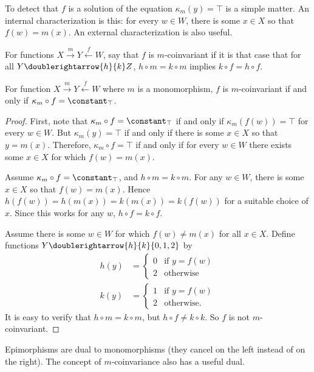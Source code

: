 To detect that $f$ is a solution of the equation $\kappa_m(y)=\top$ is a simple matter. An internal characterization is this: for every $w\in W$, there is some $x\in X$ so that $f(w)=m(x)$. An external characterization is also useful.

\begin{defn}
	For functions $X\stackrel{m}{\longrightarrow}Y\stackrel{f}{\longleftarrow}W$, say that $f$ is {$m$-coinvariant} if it is that case that for all $Y\doublerightarrow{h}{k}Z$, $h\circ m=k\circ m$ implies $k\circ f = h\circ f$.
\end{defn}

\begin{lemma}
	For function $X\stackrel{m}{\longrightarrow}Y\stackrel{f}{\longleftarrow}W$ where $m$ is a monomorphism, $f$ is $m$-coinvariant if and only if $\kappa_m\circ f = \constant_\top$.

\begin{proof}
	First, note that $\kappa_m\circ f = \constant_\top$ if and only if
	$\kappa_m(f(w))=\top$ for every $w\in W$. But $\kappa_m(y)=\top$ if and only if there is some $x\in X$ so that $y=m(x)$. Therefore, $\kappa_m\circ f=\top$ if and only if for every $w\in W$ there exists some $x\in X$ for which $f(w)=m(x)$.
	
	Assume $\kappa_m\circ f=\constant_\top$, and $h\circ m = k\circ m$. For any $w\in W$, there is some $x\in X$ so that $f(w)=m(x)$. Hence $h(f(w)) = h(m(x)) = k(m(x)) = k(f(w))$ for a suitable choice of $x$. 
	Since this works for any $w$, $h\circ f=k\circ f$. 
	
	Assume there is some $w\in W$ for which $f(w)\neq m(x)$ for all $x\in X$. Define functions $Y\doublerightarrow{h}{k}\{0,1,2\}$ by 
	\begin{align*}h(y) &= \begin{cases}
				0 &\text{if $y=f(w)$}\\
				2 &\text{otherwise}
	\end{cases}\\
	k(y) &= \begin{cases}
	1 & \text{if $y=f(w)$}\\
	2 &\text{otherwise.}
	\end{cases}
	\end{align*}
	It is easy to verify that $h\circ m = k\circ m$, but $h\circ f \neq k\circ k$. So $f$ is not $m$-coinvariant.
\end{proof}
\end{lemma}

Epimorphisms are dual to monomorphisms (they cancel on the left instead of on the right). The concept of $m$-coinvariance also has a useful dual.


